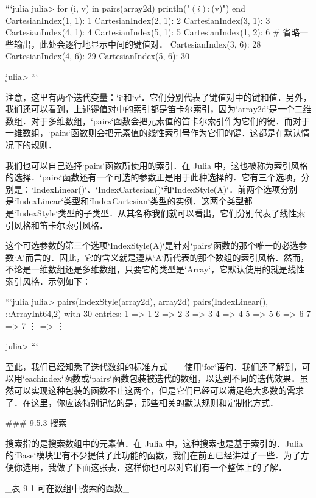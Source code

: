 ```julia
julia> for (i, v) in pairs(array2d)
           println("$(i): $(v)")
       end
CartesianIndex(1, 1): 1
CartesianIndex(2, 1): 2
CartesianIndex(3, 1): 3
CartesianIndex(4, 1): 4
CartesianIndex(5, 1): 5
CartesianIndex(1, 2): 6
# 省略一些输出，此处会逐行地显示中间的键值对．
CartesianIndex(3, 6): 28
CartesianIndex(4, 6): 29
CartesianIndex(5, 6): 30

julia> 
```

注意，这里有两个迭代变量：`i`和`v`．它们分别代表了键值对中的键和值．另外，我们还可以看到，上述键值对中的索引都是笛卡尔索引，因为`array2d`是一个二维数组．对于多维数组，`pairs`函数会把元素值的笛卡尔索引作为它们的键．而对于一维数组，`pairs`函数则会把元素值的线性索引号作为它们的键．这都是在默认情况下的规则．

我们也可以自己选择`pairs`函数所使用的索引．在 Julia 中，这也被称为索引风格的选择．`pairs`函数还有一个可选的参数正是用于此种选择的．它有三个选项，分别是：`IndexLinear()`、`IndexCartesian()`和`IndexStyle(A)`．前两个选项分别是`IndexLinear`类型和`IndexCartesian`类型的实例．这两个类型都是`IndexStyle`类型的子类型．从其名称我们就可以看出，它们分别代表了线性索引风格和笛卡尔索引风格．

这个可选参数的第三个选项`IndexStyle(A)`是针对`pairs`函数的那个唯一的必选参数`A`而言的．因此，它的含义就是遵从`A`所代表的那个数组的索引风格．然而，不论是一维数组还是多维数组，只要它的类型是`Array`，它默认使用的就是线性索引风格．示例如下：

```julia
julia> pairs(IndexStyle(array2d), array2d)
pairs(IndexLinear(), ::Array{Int64,2}) with 30 entries:
  1 => 1
  2 => 2
  3 => 3
  4 => 4
  5 => 5
  6 => 6
  7 => 7
  ⋮ => ⋮

julia> 
```

至此，我们已经知悉了迭代数组的标准方式——使用`for`语句．我们还了解到，可以用`eachindex`函数或`pairs`函数包装被迭代的数组，以达到不同的迭代效果．虽然可以实现这种包装的函数不止这两个，但是它们已经可以满足绝大多数的需求了．在这里，你应该特别记忆的是，那些相关的默认规则和定制化方式．

### 9.5.3 搜索

搜索指的是搜索数组中的元素值．在 Julia 中，这种搜索也是基于索引的．Julia 的`Base`模块里有不少提供了此功能的函数，我们在前面已经讲过了一些．为了方便你选用，我做了下面这张表．这样你也可以对它们有一个整体上的了解．

_表 9-1 可在数组中搜索的函数_

